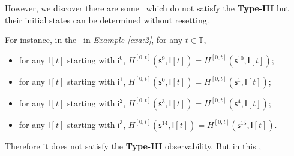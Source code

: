 However, we discover there are some \BCNs\ which do not satisfy the {\bf Type-III} but their initial states can be determined without resetting. 

For instance, in the \BCN\ in {\em Example \ref{exa:2}}, for any $t\in \mathbb{T}$, %
\begin{itemize}
\item for any $\mathsf{I}[t]$ starting with $\mathsf{i}^0$, $H^{[0,t]}(\mathsf{s}^9,\mathsf{I}[t])= H^{[0,t]}(\mathsf{s}^{10}, \mathsf{I}[t])$;
  \item for any $\mathsf{I}[t]$ starting with $\mathsf{i}^1$, $H^{[0,t]}(\mathsf{s}^0,\mathsf{I}[t])= H^{[0,t]}(\mathsf{s}^1, \mathsf{I}[t])$;
  \item for any $\mathsf{I}[t]$ starting with $\mathsf{i}^2$, $H^{[0,t]}(\mathsf{s}^3,\mathsf{I}[t])= H^{[0,t]}(\mathsf{s}^4, \mathsf{I}[t])$;
  \item for any $\mathsf{I}[t]$ starting with $\mathsf{i}^3$, $H^{[0,t]}(\mathsf{s}^{14},\mathsf{I}[t])= H^{[0,t]}(\mathsf{s}^{15}, \mathsf{I}[t])$.
\end{itemize} 
Therefore it does not satisfy the {\bf Type-III} observability. But in this \BCN,%

